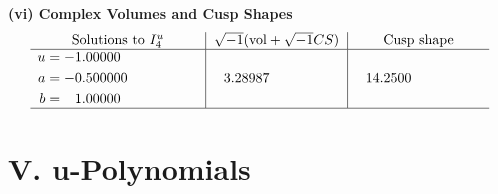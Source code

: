 \documentclass[1p]{elsarticle_modified}
\theoremstyle{definition}
\newcommand{\I}{\sqrt{-1}}
\begin{document}
\newpage\flushleft \textbf{(vi) Complex Volumes and Cusp Shapes}
$$\begin{array}{c|c|c}  
\text{Solutions to }I^u_{4}& \I (\text{vol} + \sqrt{-1}CS) & \text{Cusp shape}\\
 \hline 
\begin{aligned}
u &= -1.00000\phantom{ +0.000000I} \\
a &= -0.500000\phantom{ +0.000000I} \\
b &= \phantom{-}1.00000\phantom{ +0.000000I}\end{aligned}
 & \phantom{-}3.28987\phantom{ +0.000000I} & \phantom{-}14.2500\phantom{ +0.000000I}\\
 \hline 
 \end{array}$$\newpage
\newpage\renewcommand{\arraystretch}{1}
\centering \section*{ V. u-Polynomials}
\end{document}
